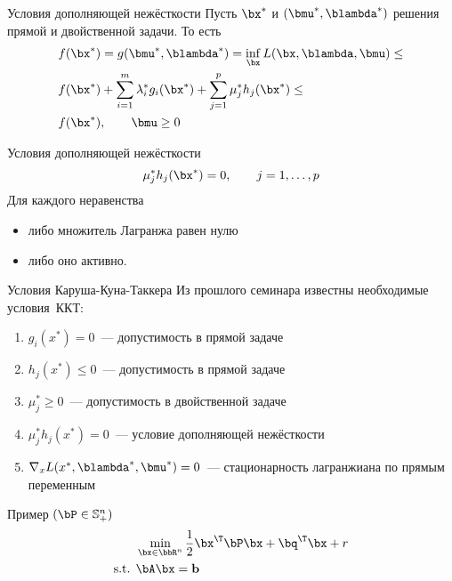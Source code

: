 \documentclass[12pt]{beamer}
\begin{document}
\begin{frame}{Условия дополняющей нежёсткости}
Пусть $\bx^*$ и $(\bmu^*, \blambda^*)$ решения прямой и двойственной задачи. То есть
\begin{equation*}
\begin{split}
& f(\bx^*) = g(\bmu^*, \blambda^*) = \inf\limits_{\bx} L(\bx, \blambda, \bmu) \leq \\
& f(\bx^*) + \sum\limits_{i=1}^m\lambda^*_i g_i(\bx^*) + \sum\limits_{j=1}^p \mu^*_j h_j(\bx^*) \leq\\
& f(\bx^*), \qquad \bmu \geq 0 
\end{split}
\end{equation*}

\begin{block}{Условия дополняющей нежёсткости}
\[
\mu^*_j h_j(\bx^*) = 0, \qquad j = 1,\ldots,p 
\]
Для каждого неравенства
\begin{itemize}
\item либо множитель Лагранжа равен нулю
\item либо оно активно.
\end{itemize} 
\end{block}
\end{frame}

\begin{frame}{Условия Каруша-Куна-Таккера}
Из прошлого семинара известны необходимые условия~ККТ: 
\begin{enumerate}
\item $g_i(x^*) = 0$~--- допустимость в прямой задаче
\item $h_j(x^*) \leq 0$~--- допустимость в прямой задаче
\item $ \mu^*_j \geq 0$~--- допустимость в двойственной задаче
\item $\mu^*_jh_j(x^*) = 0$~--- условие дополняющей нежёсткости
\item $\nabla_x L(x^*, \blambda^*, \bmu^*) = 0$~--- стационарность лагранжиана по прямым переменным
\end{enumerate}
Пример $(\bP \in \mathbb{S}^n_+)$
\begin{equation*}
\begin{split}
& \min\limits_{\bx \in \bbR^n} \frac{1}{2}\bx^{\T}\bP\bx + \bq^{\T}\bx + r\\
\text{s.t. } & \bA\bx = \mathbf{b}
\end{split}
\end{equation*}
\end{frame}
\end{document}
